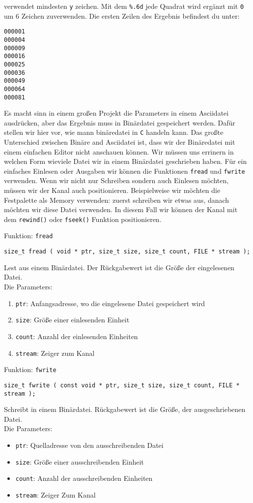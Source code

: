 verwendet mindesten \texttt{y} zeichen. Mit dem \texttt{\%.6d} jede Quadrat wird ergänzt mit 
\texttt{0} um 6 Zeichen zuverwenden. Die ersten Zeilen des Ergebnis befindest du unter:
\begin{lstlisting}
000001
000004
000009
000016
000025
000036
000049
000064
000081
\end{lstlisting}
Es macht sinn in einem großen Projekt die Parameters in einem Asciidatei ausdrücken, aber
das Ergebnis muss in Binärdatei gespeichert werden. Dafür stellen wir hier vor, wie 
mann binäredatei in \texttt{C} handeln kann. Das großte Unterschied zwischen Binäre and Asciidatei
ist, dass wir der Binäredatei mit einem einfachen Editor nicht anschauen können. Wir müssen uns
errinern in welchen Form wieviele Datei wir in einem Binärdatei geschrieben haben. Für ein einfaches 
Einlesen oder Ausgaben wir können die Funktionen \texttt{fread} und \texttt{fwrite} verwenden. Wenn wir nicht nur
Schreiben sondern auch Einlesen möchten, müssen wir der Kanal auch positionieren.  Beispielweise
wir möchten die Festpalette als Memory verwenden: zuerst schreiben wir etwas aus, danach möchten
wir diese Datei verwenden. In diesem Fall wir können der Kanal mit dem \texttt{rewind()} oder \texttt{fseek()}
Funktion positionieren.
\begin{myexampleblock}{Funktion: \texttt{fread}}
\begin{lstlisting}
size_t fread ( void * ptr, size_t size, size_t count, FILE * stream );
\end{lstlisting}
\vspace{-0.4cm}
Lest aus einem Binärdatei. Der Rückgabewert ist die Größe der eingelesenen Datei.\\
Die Parameters:
\begin{enumerate}
\item \texttt{ptr}: Anfangsadresse, wo die eingelesene Datei gespeichert wird
\item \texttt{size}: Größe einer einlesenden Einheit
\item \texttt{count}: Anzahl der einlesenden Einheiten
\item \texttt{stream}: Zeiger zum Kanal
\end{enumerate}
\end{myexampleblock}
\begin{myexampleblock}{Funktion: \texttt{fwrite}}
\begin{lstlisting}
size_t fwrite ( const void * ptr, size_t size, size_t count, FILE * stream );
\end{lstlisting}
\vspace{-0.4cm}
Schreibt in einem Binärdatei. Rückgabewert ist die Größe, der ausgeschriebenen
Datei.\\ Die Parameters:
\begin{itemize}
\item \texttt{ptr}: Quelladresse von den ausschreibenden Datei 
\item \texttt{size}: Größe einer ausschreibenden Einheit
\item \texttt{count}: Anzahl der ausschreibenden Einheiten
\item \texttt{stream}: Zeiger Zum Kanal
\end{itemize}
\end{myexampleblock}
